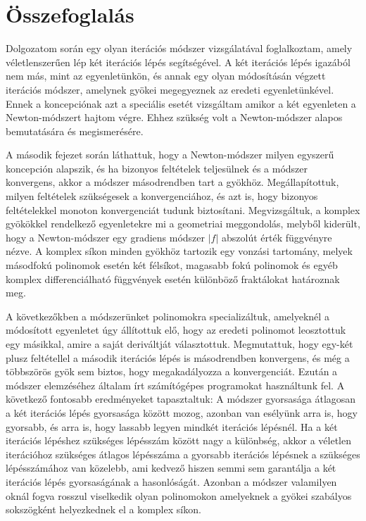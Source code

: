 \documentclass[a4paper,12pt]{report}
\begin{document}











\chapter{Összefoglalás}
Dolgozatom során egy olyan iterációs módszer vizsgálatával foglalkoztam, amely véletlenszerűen lép két iterációs lépés segítségével. A két iterációs lépés igazából nem más, mint az egyenletünkön, és annak egy olyan módosításán végzett iterációs módszer, amelynek gyökei megegyeznek az eredeti egyenletünkével. Ennek a koncepciónak azt a speciális esetét vizsgáltam amikor a két egyenleten a Newton-módszert hajtom végre. Ehhez szükség volt a Newton-módszer alapos bemutatására és megismerésére. 

A második fejezet során láthattuk, hogy a Newton-módszer milyen egyszerű koncepción alapszik, és ha bizonyos feltételek teljesülnek és a módszer konvergens, akkor a módszer másodrendben tart a gyökhöz. Megállapítottuk, milyen feltételek szükségesek a konvergenciához, és azt is, hogy bizonyos feltételekkel monoton konvergenciát tudunk biztosítani. Megvizsgáltuk, a komplex gyökökkel rendelkező egyenletekre mi a geometriai meggondolás, melyből kiderült, hogy a Newton-módszer egy gradiens módszer $|f|$ abszolút érték függvényre nézve. A komplex síkon minden gyökhöz tartozik egy vonzási tartomány, melyek másodfokú polinomok esetén két félsíkot, magasabb fokú polinomok és egyéb komplex differenciálható függvények esetén különböző fraktálokat határoznak meg.

A következőkben a módszerünket polinomokra specializáltuk, amelyeknél a módosított egyenletet úgy állítottuk elő, hogy az eredeti polinomot leosztottuk egy másikkal, amire a saját deriváltját választottuk. Megmutattuk, hogy egy-két plusz feltétellel a második iterációs lépés is másodrendben konvergens, és még a többszörös gyök sem biztos, hogy megakadályozza a konvergenciát. Ezután a módszer elemzéséhez általam írt számítógépes programokat használtunk fel. A következő fontosabb eredményeket tapasztaltuk: A módszer gyorsasága átlagosan a két iterációs lépés gyorsasága között mozog, azonban van esélyünk arra is, hogy gyorsabb, és arra is, hogy lassabb legyen mindkét iterációs lépésnél. Ha a két iterációs lépéshez szükséges lépésszám között nagy a különbség, akkor a véletlen iterációhoz szükséges átlagos lépésszáma a gyorsabb iterációs lépésnek a szükséges lépésszámához van közelebb, ami kedvező hiszen semmi sem garantálja a két iterációs lépés gyorsaságának a hasonlóságát. Azonban a módszer valamilyen oknál fogva rosszul viselkedik olyan polinomokon amelyeknek a gyökei szabályos sokszögként helyezkednek el a komplex síkon.
\end{document}
